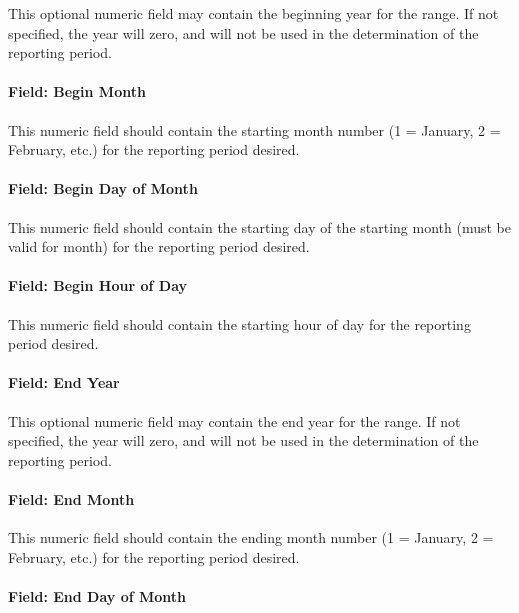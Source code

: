 This optional numeric field may contain the beginning year for the range. If not
specified, the year will zero, and will not be used in the determination of the
reporting period.

\paragraph{Field: Begin Month}\label{field-begin-month-3}

This numeric field should contain the starting month number (1 = January, 2 =
February, etc.) for the reporting period desired.

\paragraph{Field: Begin Day of Month}\label{field-begin-day-of-month-3}

This numeric field should contain the starting day of the starting month (must
be valid for month) for the reporting period desired.

\paragraph{Field: Begin Hour of Day}\label{field-begin-hour-of-day}

This numeric field should contain the starting hour of day for the reporting
period desired.

\paragraph{Field: End Year}\label{field-end-year-2}

This optional numeric field may contain the end year for the range. If not
specified, the year will zero, and will not be used in the determination of the
reporting period.

\paragraph{Field: End Month}\label{field-end-month-3}

This numeric field should contain the ending month number (1 = January, 2 =
February, etc.) for the reporting period desired.

\paragraph{Field: End Day of Month}\label{field-end-day-of-month-3}

